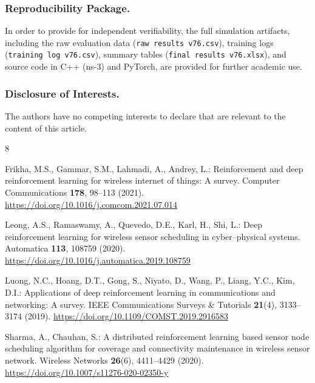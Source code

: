 \documentclass[runningheads]{llncs}
\begin{document}
\subsubsection{Reproducibility Package.}
In order to provide for independent verifiability, the full simulation artifacts, including the raw evaluation data (\texttt{raw results v76.csv}), training logs (\texttt{training log v76.csv}), summary tables (\texttt{final results v76.xlsx}), and source code in C++ (ns-3) and PyTorch, are provided for further academic use.

\subsubsection{Disclosure of Interests.}
The authors have no competing interests to declare that are relevant to the content of this article.

\begin{thebibliography}{8}

Frikha, M.S., Gammar, S.M., Lahmadi, A., Andrey, L.: Reinforcement and deep reinforcement learning for wireless internet of things: A survey. Computer Communications \textbf{178}, 98--113 (2021). \url{https://doi.org/10.1016/j.comcom.2021.07.014}

Leong, A.S., Ramaswamy, A., Quevedo, D.E., Karl, H., Shi, L.: Deep reinforcement learning for wireless sensor scheduling in cyber--physical systems. Automatica \textbf{113}, 108759 (2020). \url{https://doi.org/10.1016/j.automatica.2019.108759}

Luong, N.C., Hoang, D.T., Gong, S., Niyato, D., Wang, P., Liang, Y.C., Kim, D.I.: Applications of deep reinforcement learning in communications and networking: A survey. IEEE Communications Surveys \& Tutorials \textbf{21}(4), 3133--3174 (2019). \url{https://doi.org/10.1109/COMST.2019.2916583}

Sharma, A., Chauhan, S.: A distributed reinforcement learning based sensor node scheduling algorithm for coverage and connectivity maintenance in wireless sensor network. Wireless Networks \textbf{26}(6), 4411--4429 (2020). \url{https://doi.org/10.1007/s11276-020-02350-y}

\end{thebibliography}
\end{document}
